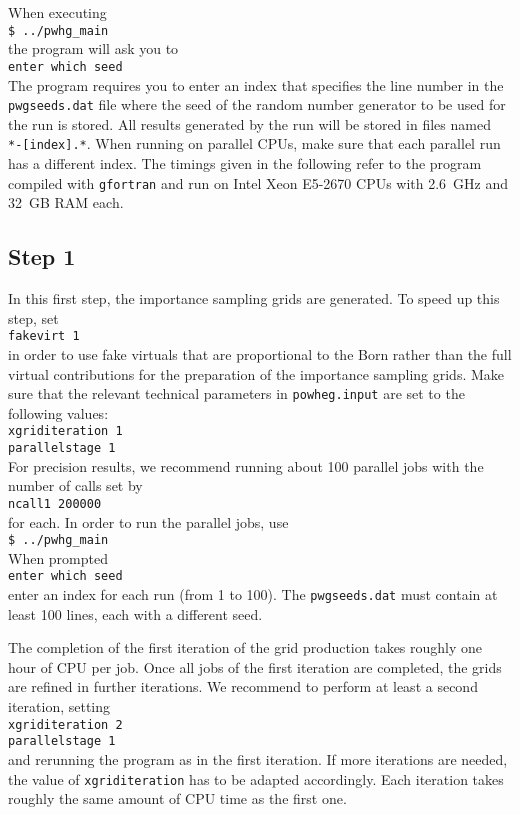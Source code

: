 \documentclass[a4paper,11pt]{article}
\begin{document}
When executing
\\[2ex]
{\tt \$ ../pwhg\_main}
\\[2ex]
the program will ask you to
\\[2ex]
{\tt enter which seed}
\\[2ex]
The program requires you to enter an index that specifies the line
number in the {\tt pwgseeds.dat} file where the seed of the random
number generator to be used for the run is stored. All results
generated by the run will be stored in files named {\tt
  *-[index].*}. When running on parallel CPUs, make sure that each
parallel run has a different index.
The timings given in the following refer to the program compiled with
{\tt gfortran} and run on Intel Xeon E5-2670 CPUs with 2.6~GHz and 32~GB RAM each.


\subsection*{Step 1}

In this first step, the importance sampling grids are generated. To speed up this step, set 
\\[2ex] 
{\tt fakevirt 1}
\\[2ex] 
in order to use fake virtuals that are proportional to the Born rather than the full virtual contributions for the preparation of the importance sampling grids. 
Make sure that the relevant technical parameters in {\tt powheg.input}
are set to the following values:
\\[2ex]
{\tt xgriditeration 1}
\\
{\tt parallelstage 1}
\\[2ex]
For precision results, we recommend running about 100 parallel jobs with the number of calls set by
\\[2ex] 
{\tt ncall1 200000}
\\[2ex] 
for each. 
%
In order to run the parallel jobs, use
\\[2ex]
{\tt \$ ../pwhg\_main}
\\[2ex]
When prompted
\\[2ex]
{\tt enter which seed}
\\[2ex]
enter an index for each run (from 1 to 100). The {\tt pwgseeds.dat}
must contain at least 100 lines, each with a different seed.

The completion of the first iteration of the grid production takes
roughly one hour of CPU per job.
Once all jobs of the first iteration are completed,
the grids are refined in further iterations.
We recommend to perform at least a second iteration, setting 
\\[2ex]
{\tt xgriditeration   2}
\\
{\tt parallelstage     1}
\\[2ex]
%
and rerunning the program as in the first iteration.
If more iterations are needed, the value of {\tt xgriditeration}
has to be adapted accordingly.
Each iteration takes roughly the same amount of CPU time as the first one. 
 
\end{document}
